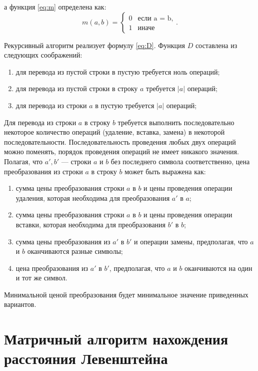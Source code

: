 а функция \ref{eq:m} определена как:
\begin{equation}
	\label{eq:m}
	m(a, b) = \begin{cases}
		0 &\text{если a = b,}\\
		1 &\text{иначе}
	\end{cases}.
\end{equation}

Рекурсивный алгоритм реализует формулу \ref{eq:D}.
Функция $D$ составлена из следующих соображений:
\begin{enumerate}[label={\arabic*)}]
	\item для перевода из пустой строки в пустую требуется ноль операций;
	\item для перевода из пустой строки в строку $a$ требуется $|a|$ операций;
	\item для перевода из строки $a$ в пустую требуется $|a|$ операций;
\end{enumerate}
Для перевода из строки $a$ в строку $b$ требуется выполнить последовательно некоторое количество операций (удаление, вставка, замена) в некоторой последовательности. Последовательность проведения любых двух операций можно поменять, порядок проведения операций не имеет никакого значения. Полагая, что $a', b'$  — строки $a$ и $b$ без последнего символа соответственно, цена преобразования из строки $a$ в строку $b$ может быть выражена как:
	\begin{enumerate}[label={\arabic*)}]
		\item сумма цены преобразования строки $a$ в $b$ и цены проведения операции удаления, которая необходима для преобразования $a'$ в $a$;
		\item сумма цены преобразования строки $a$ в $b$  и цены проведения операции вставки, которая необходима для преобразования $b'$ в $b$;
		\item сумма цены преобразования из $a'$ в $b'$ и операции замены, предполагая, что $a$ и $b$ оканчиваются разные символы;
		\item цена преобразования из $a'$ в $b'$, предполагая, что $a$ и $b$ оканчиваются на один и тот же символ.
	\end{enumerate}
Минимальной ценой преобразования будет минимальное значение приведенных вариантов.

\section{Матричный алгоритм нахождения расстояния Левенштейна}

